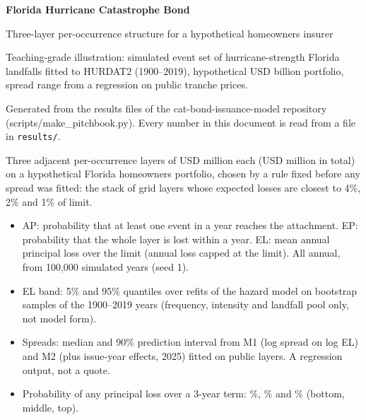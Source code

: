 \documentclass[12pt]{article}
\newcommand{\slide}[1]{\newpage{\color{accent}\Large\textbf{#1}}\par\vspace{2pt}{\color{accent}\rule{\linewidth}{1pt}}\par\vspace{4pt}}
\begin{document}
\thispagestyle{fancy}
\vspace*{0.6in}
{\color{accent}\Huge\textbf{Florida Hurricane Catastrophe Bond}}\par\vspace{8pt}
{\LARGE Three-layer per-occurrence structure for a hypothetical homeowners insurer}\par\vspace{18pt}
{\large Teaching-grade illustration: simulated event set of hurricane-strength Florida landfalls
fitted to HURDAT2 (1900--2019), hypothetical USD \numTIVbn{} billion portfolio, spread range from a regression on
\numNLayers{} public tranche prices.}\par\vspace{30pt}
\par\vfill
{\color{muted}Generated from the results files of the cat-bond-issuance-model repository
(scripts/make\_pitchbook.py). Every number in this document is read from a file in
\texttt{results/}.}

\slide{Transaction summary (hypothetical)}
Three adjacent per-occurrence layers of USD \numLayerLimitUSDm{} million each
(USD \numTotalLimitUSDm{} million in total) on a hypothetical Florida homeowners portfolio,
chosen by a rule fixed before any spread was fitted: the stack of grid layers whose expected
losses are closest to 4\%, 2\% and 1\% of limit.\par\vspace{6pt}
\centering
\par\vspace{6pt}
\raggedright\normalsize
\begin{itemize}
\item AP: probability that at least one event in a year reaches the attachment. EP: probability
  that the whole layer is lost within a year. EL: mean annual principal loss over the limit
  (annual loss capped at the limit). All annual, from 100,000 simulated years (seed 1).
\item EL band: 5\% and 95\% quantiles over \numNBand{} refits of the hazard model on bootstrap
  samples of the 1900--2019 years (frequency, intensity and landfall pool only, not model form).
\item Spreads: median and 90\% prediction interval from M1 (log spread on log EL) and M2 (plus
  issue-year effects, 2025) fitted on public layers. A regression output, not a quote.
\item Probability of any principal loss over a 3-year term: \numPThreeBot\%, \numPThreeMid\% and
  \numPThreeTop\% (bottom, middle, top).
\end{itemize}
\end{document}
